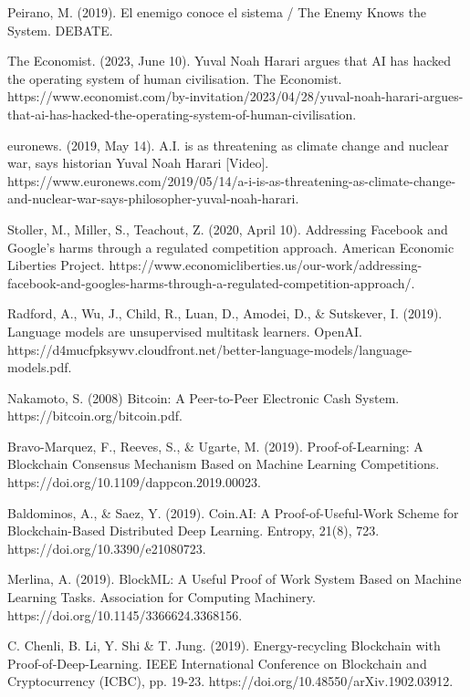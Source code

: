 \documentclass[conference]{IEEEtran}
\begin{document}
    \begin{thebibliography}{00}
    
     Peirano, M. (2019). El enemigo conoce el sistema / The Enemy Knows the System. DEBATE.
    
     The Economist. (2023, June 10). Yuval Noah Harari argues that AI has hacked the operating system of human civilisation. The Economist. https://www.economist.com/by-invitation/2023/04/28/yuval-noah-harari-argues-that-ai-has-hacked-the-operating-system-of-human-civilisation.
    
     euronews. (2019, May 14). A.I. is as threatening as climate change and nuclear war, says historian Yuval Noah Harari [Video]. https://www.euronews.com/2019/05/14/a-i-is-as-threatening-as-climate-change-and-nuclear-war-says-philosopher-yuval-noah-harari.
    
     Stoller, M., Miller, S., Teachout, Z. (2020, April 10). Addressing Facebook and Google’s harms through a regulated competition approach. American Economic Liberties Project. https://www.economicliberties.us/our-work/addressing-facebook-and-googles-harms-through-a-regulated-competition-approach/.
    
     Radford, A., Wu, J., Child, R., Luan, D., Amodei, D., \& Sutskever, I. (2019). Language models are unsupervised multitask learners. OpenAI. https://d4mucfpksywv.cloudfront.net/better-language-models/language-models.pdf.
    
     Nakamoto, S. (2008) Bitcoin: A Peer-to-Peer Electronic Cash System. https://bitcoin.org/bitcoin.pdf.
    
     Bravo-Marquez, F., Reeves, S., \& Ugarte, M. (2019). Proof-of-Learning: A Blockchain Consensus Mechanism Based on Machine Learning Competitions. https://doi.org/10.1109/dappcon.2019.00023.
    
     Baldominos, A., \& Saez, Y. (2019). Coin.AI: A Proof-of-Useful-Work Scheme for Blockchain-Based Distributed Deep Learning. Entropy, 21(8), 723. https://doi.org/10.3390/e21080723.
    
     Merlina, A. (2019). BlockML: A Useful Proof of Work System Based on Machine Learning Tasks. Association for Computing Machinery. https://doi.org/10.1145/3366624.3368156.
    
     C. Chenli, B. Li, Y. Shi \& T. Jung. (2019). Energy-recycling Blockchain with Proof-of-Deep-Learning. IEEE International Conference on Blockchain and Cryptocurrency (ICBC), pp. 19-23. https://doi.org/10.48550/arXiv.1902.03912.
    

\end{thebibliography}
\end{document}
